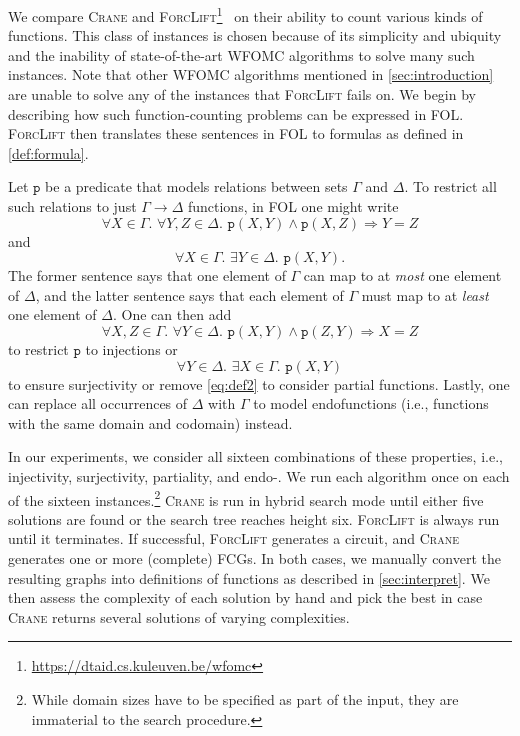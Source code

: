 \documentclass{article}
\theoremstyle{definition}
\begin{document}

We compare \textsc{Crane} and
\textsc{ForcLift}\footnote{\url{https://dtaid.cs.kuleuven.be/wfomc}}~\cite{DBLP:conf/ijcai/BroeckTMDR11}
on their ability to count various kinds of functions. This class of instances is
chosen because of its simplicity and ubiquity and the inability of
state-of-the-art WFOMC algorithms to solve many such instances. Note that other
WFOMC algorithms mentioned in \cref{sec:introduction} are unable to solve any of
the instances that \textsc{ForcLift} fails on. We begin by describing how such
function-counting problems can be expressed in FOL\@. \textsc{ForcLift} then
translates these sentences in FOL to formulas as defined in \cref{def:formula}.

Let $\texttt{p}$ be a predicate that models relations between sets $\Gamma$ and
$\Delta$. To restrict all such relations to just $\Gamma \to \Delta$ functions,
in FOL one might write
\[
  \forall X \in \Gamma\text{. }\forall Y,Z \in \Delta\text{. }\texttt{p}(X, Y) \land \texttt{p}(X, Z) \Rightarrow Y = Z
\]
and
\begin{equation}\label{eq:def2}
  \forall X \in \Gamma\text{. }\exists Y \in \Delta\text{. }\texttt{p}(X, Y).
\end{equation}
The former sentence says that one element of $\Gamma$ can map to at \emph{most}
one element of $\Delta$, and the latter sentence says that each element of
$\Gamma$ must map to at \emph{least} one element of $\Delta$. One can then add
\[
  \forall X,Z \in \Gamma\text{. }\forall Y \in \Delta\text{. }\texttt{p}(X, Y) \land \texttt{p}(Z, Y) \Rightarrow X = Z
\]
to restrict $\texttt{p}$ to injections or
\[
  \forall Y \in \Delta\text{. }\exists X \in \Gamma\text{. }\texttt{p}(X, Y)
\]
to ensure surjectivity or remove \cref{eq:def2} to consider partial functions.
Lastly, one can replace all occurrences of $\Delta$ with $\Gamma$ to model
endofunctions (i.e., functions with the same domain and codomain) instead.

In our experiments, we consider all sixteen combinations of these properties,
i.e., injectivity, surjectivity, partiality, and endo-. We run each algorithm
once on each of the sixteen instances.\footnote{While domain sizes have to be
  specified as part of the input, they are immaterial to the search procedure.}
\textsc{Crane} is run in hybrid search mode until either five solutions are
found or the search tree reaches height six. \textsc{ForcLift} is always run
until it terminates. If successful, \textsc{ForcLift} generates a circuit, and
\textsc{Crane} generates one or more (complete) FCGs. In both cases, we manually
convert the resulting graphs into definitions of functions as described in
\cref{sec:interpret}. We then assess the complexity of each solution by hand and
pick the best in case \textsc{Crane} returns several solutions of varying
complexities.
\end{document}
